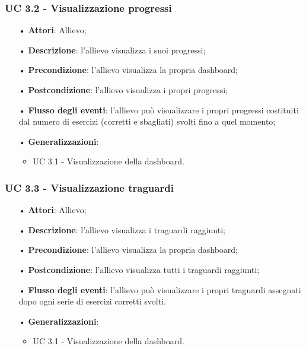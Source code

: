 \subsubsection{UC 3.2 - Visualizzazione progressi}
\begin{itemize}
\item[•]\textbf{Attori}: Allievo;
\item[•]\textbf{Descrizione}: l'allievo visualizza i suoi progressi;
\item[•]\textbf{Precondizione}: l'allievo visualizza la propria dashboard;
\item[•]\textbf{Postcondizione}: l'allievo visualizza i propri progressi;
\item[•]\textbf{Flusso degli eventi}: l'allievo può visualizzare i propri progressi costituiti dal numero di esercizi (corretti e sbagliati) svolti fino a quel momento;
\item[•]\textbf{Generalizzazioni}:
\begin{itemize}
\item UC 3.1 - Visualizzazione della dashboard.
\end{itemize}
\end{itemize}
\subsubsection{UC 3.3 - Visualizzazione traguardi}
\begin{itemize}
\item[•]\textbf{Attori}: Allievo;
\item[•]\textbf{Descrizione}: l'allievo visualizza i traguardi raggiunti;
\item[•]\textbf{Precondizione}: l'allievo visualizza la propria dashboard;
\item[•]\textbf{Postcondizione}: l'allievo visualizza tutti i traguardi raggiunti;
\item[•]\textbf{Flusso degli eventi}: l'allievo può visualizzare i propri traguardi assegnati dopo ogni serie di esercizi corretti svolti.
\item[•]\textbf{Generalizzazioni}:
\begin{itemize}
\item UC 3.1 - Visualizzazione della dashboard.
\end{itemize}
\end{itemize}

